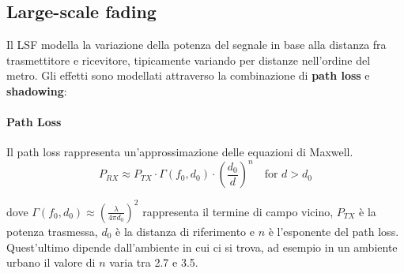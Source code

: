\begin{center}
\end{center}


\subsection*{Large-scale fading}
Il LSF modella la variazione della potenza del segnale in base alla distanza fra trasmettitore e ricevitore, tipicamente variando per distanze nell'ordine del metro. Gli effetti sono modellati attraverso la combinazione di \textbf{path loss} e \textbf{shadowing}:

\paragraph*{Path Loss}
Il path loss rappresenta un'approssimazione delle equazioni di Maxwell.
\begin{equation}
    P_{RX} \approx P_{TX} \cdot \Gamma(f_0, d_0) \cdot \left( \frac{d_0}{d} \right)^n \quad \text{for } d > d_0
\end{equation}

dove \( \Gamma(f_0, d_0) \approx \left( \frac{\lambda}{4 \pi d_0} \right)^2 \) rappresenta il termine di campo vicino, \( P_{TX} \) è la potenza trasmessa, \( d_0 \) è la distanza di riferimento e \( n \) è l'esponente del path loss. Quest'ultimo dipende dall'ambiente in cui ci si trova, ad esempio in un ambiente urbano il valore di \( n \) varia tra 2.7 e 3.5. 

